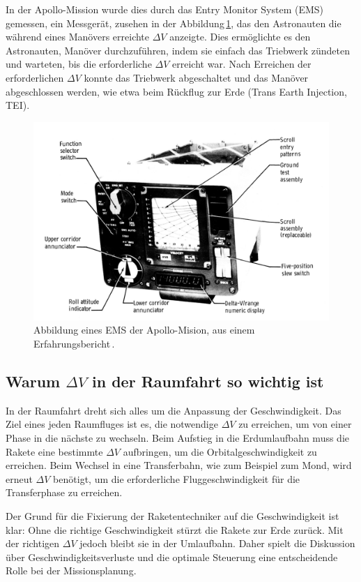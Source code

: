 In der Apollo-Mission wurde dies durch das Entry Monitor System (EMS) gemessen, ein Messgerät, zusehen in der Abbildung\,\ref{fig:leo:ems}, das den Astronauten die während eines Manövers erreichte \(\Delta V\) anzeigte. 
Dies ermöglichte es den Astronauten, Manöver durchzuführen, indem sie einfach das Triebwerk zündeten und warteten, bis die erforderliche \(\Delta V\) erreicht war. 
Nach Erreichen der erforderlichen \(\Delta V\) konnte das Triebwerk abgeschaltet und das Manöver abgeschlossen werden, wie etwa beim Rückflug zur Erde (Trans Earth Injection, TEI).


\begin{figure}
	\centering
	\includegraphics[width=\linewidth]{papers/leo/Grafiken/EMS.png}
	\caption{Abbildung eines EMS der Apollo-Mision, aus einem Erfahrungsbericht\,\cite{wilson1976apollo}.}
	\label{fig:leo:ems}
\end{figure}


\subsection{Warum \(\Delta V\) in der Raumfahrt so wichtig ist}
In der Raumfahrt dreht sich alles um die Anpassung der Geschwindigkeit. 
Das Ziel eines jeden Raumfluges ist es, die notwendige \(\Delta V\) zu erreichen, um von einer Phase in die nächste zu wechseln. 
Beim Aufstieg in die Erdumlaufbahn muss die Rakete eine bestimmte \(\Delta V\) aufbringen, um die Orbitalgeschwindigkeit zu erreichen. 
Beim Wechsel in eine Transferbahn, wie zum Beispiel zum Mond, wird erneut \(\Delta V\) benötigt, um die erforderliche Fluggeschwindigkeit für die Transferphase zu erreichen.

Der Grund für die Fixierung der Raketentechniker auf die Geschwindigkeit ist klar: Ohne die richtige Geschwindigkeit stürzt die Rakete zur Erde zurück. 
Mit der richtigen \(\Delta V\) jedoch bleibt sie in der Umlaufbahn. Daher spielt die Diskussion über Geschwindigkeitsverluste und die optimale Steuerung eine entscheidende Rolle bei der Missionsplanung.

